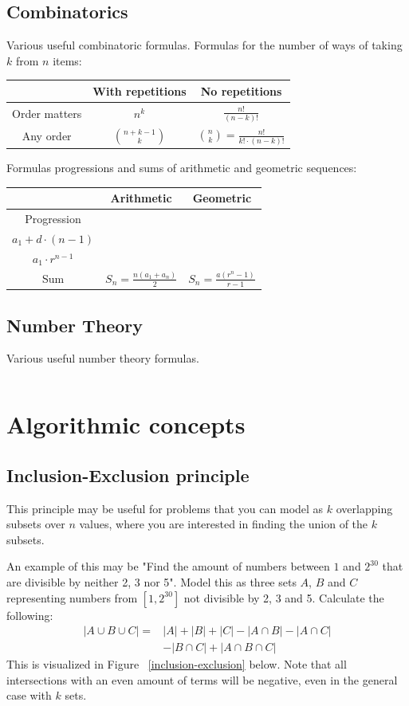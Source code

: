 \documentclass[8pt,a4paper,landscape,oneside]{amsart}
\newcommand{\code}[1]{\inputminted[fontsize=\normalsize,baselinestretch=1]{java}{code/#1}}
\begin{document}
\begin{multicols*}{3}
  \subsection{Combinatorics}
  Various useful combinatoric formulas.
  Formulas for the number of ways of taking $k$ from $n$ items:
  \begin{center}
  \begin{tabular}{|c|c|c|} \hline
  & With repetitions & No repetitions \\
  \hline
  Order matters & $n^k$ & $\frac{n!}{(n-k)!}$ \\ \hline
  Any order & $\binom{n+k-1}{k}$ & $\binom{n}{k} = \frac{n!}{k!\cdot(n-k)!}$ \\ \hline
  \end{tabular}
  \end{center}
  Formulas progressions and sums of arithmetic and geometric sequences:
  \begin{center}
  \begin{tabular}{|c|c|c|} \hline
  & Arithmetic & Geometric \\
  \hline
  Progression & \shortstack{$a_n = a_{n-1} + d =$ \\ $a_1 + d\cdot(n-1)$} & \shortstack{$a_n = a_{n-1}\cdot r =$ \\ $a_1\cdot r^{n-1}$} \\ \hline
  Sum & $S_n = \frac{n(a_1+a_n)}{2}$ & $S_n = \frac{a(r^n-1)}{r-1}$ \\ \hline
  \end{tabular}
  \end{center}
  
  \subsection{Number Theory}
  Various useful number theory formulas.
  \code{Math/Gcd.java}


\section{Algorithmic concepts}
  \subsection{Inclusion-Exclusion principle}
  This principle may be useful for problems that you can model as $k$ overlapping subsets over $n$ values, where you are interested in finding the union of the $k$ subsets.
  
  An example of this may be "Find the amount of numbers between $1$ and $2^{30}$ that are divisible by neither 2, 3 nor 5". Model this as three sets $A$, $B$ and $C$ representing numbers from $[1, 2^{30}]$ not divisible by 2, 3 and 5. Calculate the following:
  \[
  \begin{split}
  |A \cup B \cup C| = & |A| + |B| + |C| - |A \cap B| - |A \cap C| \\
  & - |B \cap C| + |A \cap B \cap C|
  \end{split}
  \]
  This is visualized in Figure ~\ref{inclusion-exclusion} below. Note that all intersections with an even amount of terms will be negative, even in the general case with $k$ sets.
  

\end{multicols*}
\end{document}
